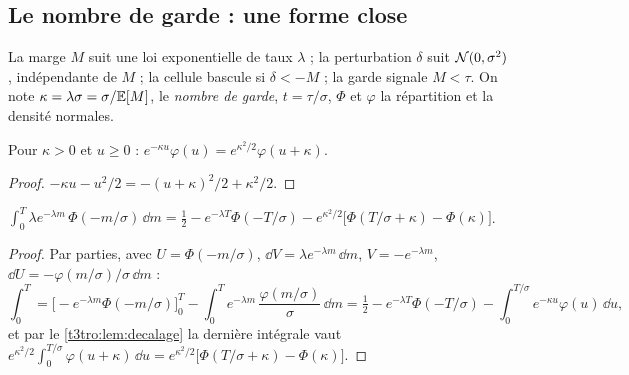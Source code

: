 \subsection{Le nombre de garde : une forme close}\label{t3tro:sec:theoreme}

\begin{hypothese}\label{t3tro:hyp:homogene}
La marge $M$ suit une loi exponentielle de taux $\lambda$ ; la perturbation $\delta$ suit $\mathcal{N}(0, \sigma^2)$, indépendante de $M$ ; la cellule bascule si $\delta < -M$ ; la garde signale $M < \tau$. On note $\kappa = \lambda\sigma = \sigma/\mathbb{E}[M]$, le \emph{nombre de garde}, $t = \tau/\sigma$, $\Phi$ et $\varphi$ la répartition et la densité normales.
\end{hypothese}

\begin{lemme}\label{t3tro:lem:decalage}
Pour $\kappa > 0$ et $u \ge 0$ : $e^{-\kappa u}\varphi(u) = e^{\kappa^2/2}\varphi(u + \kappa)$.
\end{lemme}
\begin{proof}
$-\kappa u - u^2/2 = -(u + \kappa)^2/2 + \kappa^2/2$.
\end{proof}

\begin{lemme}\label{t3tro:lem:integrale}
$\displaystyle\int_0^T \lambda e^{-\lambda m}\,\Phi(-m/\sigma)\,\dd m = \tfrac12 - e^{-\lambda T}\Phi(-T/\sigma) - e^{\kappa^2/2}\bigl[\Phi(T/\sigma + \kappa) - \Phi(\kappa)\bigr]$.
\end{lemme}
\begin{proof}
Par parties, avec $U = \Phi(-m/\sigma)$, $\dd V = \lambda e^{-\lambda m}\,\dd m$, $V = -e^{-\lambda m}$, $\dd U = -\varphi(m/\sigma)/\sigma\,\dd m$ :
\[
\int_0^T = \bigl[-e^{-\lambda m}\Phi(-m/\sigma)\bigr]_0^T - \int_0^T e^{-\lambda m}\,\frac{\varphi(m/\sigma)}{\sigma}\,\dd m = \tfrac12 - e^{-\lambda T}\Phi(-T/\sigma) - \int_0^{T/\sigma} e^{-\kappa u}\varphi(u)\,\dd u ,
\]
et par le \cref{t3tro:lem:decalage} la dernière intégrale vaut $e^{\kappa^2/2}\int_0^{T/\sigma}\varphi(u + \kappa)\,\dd u = e^{\kappa^2/2}\bigl[\Phi(T/\sigma + \kappa) - \Phi(\kappa)\bigr]$.
\end{proof}

